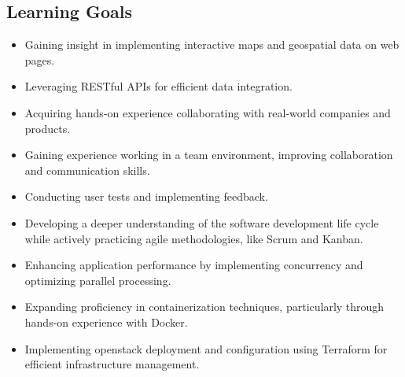 \subsection{Learning Goals}
\begin{itemize}
    \item Gaining insight in implementing interactive maps and geospatial data on web pages.
    \item Leveraging RESTful APIs for efficient data integration.
    \item Acquiring hands-on experience collaborating with real-world companies and products.
    \item Gaining experience working in a team environment, improving collaboration and communication skills.
    \item Conducting user tests and implementing feedback. 
    \item Developing a deeper understanding of the software development life cycle while actively practicing agile methodologies, like Scrum and Kanban.
    \item Enhancing application performance by implementing concurrency and optimizing parallel processing.
    \item Expanding proficiency in containerization techniques, particularly through hands-on experience with Docker.
    \item Implementing \Gls{openstack} deployment and configuration using Terraform for efficient infrastructure management.

\end{itemize}
